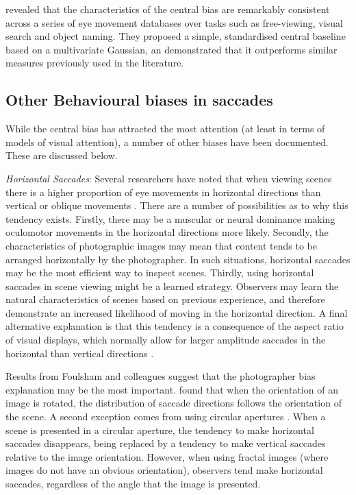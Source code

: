 \documentclass[a4paper, twocolumn, oneside, 10pt]{article}
\begin{document}
\cite{clarke-tatler2014} revealed that the characteristics of the central bias are remarkably consistent across a series of eye movement databases over tasks such as free-viewing, visual search and object naming. They proposed a simple, standardised central baseline based on a multivariate Gaussian, an demonstrated that it outperforms similar measures previously used in the literature.

\subsection{Other Behavioural biases in saccades}
While the central bias has attracted the most attention (at least in terms of models of visual attention), a number of other biases have been documented. These are discussed below. 

\textit{Horizontal Saccades}: Several researchers have noted that when viewing scenes there is a higher proportion of eye movements in horizontal directions than vertical or oblique movements \citep[e.g.][]{gilchrist2006,foulsham2008,tatler-vincent2009,lappe1998,lee2002}. There are a number of possibilities as to why this tendency exists. Firstly, there may be a muscular or neural dominance making oculomotor movements in the horizontal directions more likely. Secondly, the characteristics of photographic images may mean that content tends to be arranged horizontally by the photographer. In such situations, horizontal saccades may be the most efficient way to inspect scenes. Thirdly, using horizontal saccades in scene viewing might be a learned strategy. Observers may learn the natural characteristics of scenes based on previous experience, and therefore demonstrate an increased likelihood of moving in the horizontal direction. A final alternative explanation is that this tendency is a consequence of the aspect ratio of visual displays, which normally allow for larger amplitude saccades in the horizontal than vertical directions \citep{wartburg2007}.

Results from Foulsham and colleagues suggest that the photographer bias explanation may be the most important. \cite{foulsham2008} found that when the orientation of an image is rotated, the distribution of saccade directions follows the orientation of the scene. A second exception comes from using circular apertures \citep{foulsham-kingstone2010}. When a scene is presented in a circular aperture, the tendency to make horizontal saccades disappears, being replaced by a tendency to make vertical saccades relative to the image orientation. However, when using fractal images (where images do not have an obvious orientation), observers tend make horizontal saccades, regardless of the angle that the image is presented.
\end{document}
